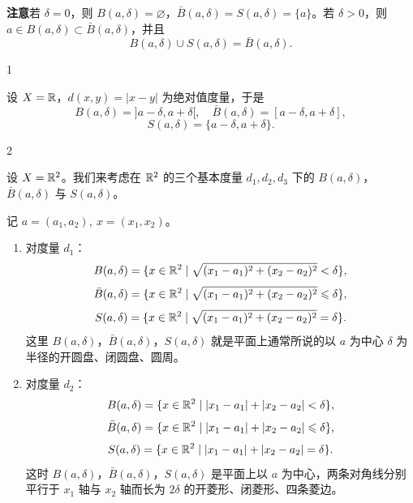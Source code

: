 \textbf{注意}\quad 若 $\delta=0$，则 $B(a,\delta)=\varnothing$，$\bar{B}(a,\delta)=S(a,\delta)=\{a\}$。若 $\delta>0$，则 $a\in B(a,\delta)\subset\bar{B}(a,\delta)$，并且
\[B(a,\delta)\cup S(a,\delta)=\bar{B}(a,\delta).\]

\begin{sourceexample}{1}

设 $X=\mathbb{R}$，$d(x,y)=|x-y|$ 为绝对值度量，于是
\[B(a,\delta)=]a-\delta,a+\delta[,\quad\bar{B}(a,\delta)=[a-\delta,a+\delta],\]
\[S(a,\delta)=\{a-\delta,a+\delta\}.\]

\end{sourceexample}

\begin{sourceexample}{2}

设 $X=\mathbb{R}^2$。我们来考虑在 $\mathbb{R}^2$ 的三个基本度量 $d_1,d_2,d_3$ 下的 $B(a,\delta)$，$\bar{B}(a,\delta)$ 与 $S(a,\delta)$。

记 $a=(a_1,a_2),\ x=(x_1,x_2)$。

\begin{enumerate}[label=\arabic{enumi})]
\item 对度量 $d_1$：
\[B(a,\delta)=\{x\in\mathbb{R}^2\mid\sqrt{(x_1-a_1)^2+(x_2-a_2)^2}<\delta\},\]
\[\bar{B}(a,\delta)=\{x\in\mathbb{R}^2\mid\sqrt{(x_1-a_1)^2+(x_2-a_2)^2}\leqslant\delta\},\]
\[S(a,\delta)=\{x\in\mathbb{R}^2\mid\sqrt{(x_1-a_1)^2+(x_2-a_2)^2}=\delta\}.\]
这里 $B(a,\delta)$，$\bar{B}(a,\delta)$，$S(a,\delta)$ 就是平面上通常所说的以 $a$ 为中心 $\delta$ 为半径的开圆盘、闭圆盘、圆周。
\item 对度量 $d_2$：
\[B(a,\delta)=\{x\in\mathbb{R}^2\mid|x_1-a_1|+|x_2-a_2|<\delta\},\]
\[\bar{B}(a,\delta)=\{x\in\mathbb{R}^2\mid|x_1-a_1|+|x_2-a_2|\leqslant\delta\},\]
\[S(a,\delta)=\{x\in\mathbb{R}^2\mid|x_1-a_1|+|x_2-a_2|=\delta\}.\]
这时 $B(a,\delta)$，$\bar{B}(a,\delta)$，$S(a,\delta)$ 是平面上以 $a$ 为中心，两条对角线分别平行于 $x_1$ 轴与 $x_2$ 轴而长为 $2\delta$ 的开菱形、闭菱形、四条菱边。


\end{enumerate}
\end{sourceexample}
